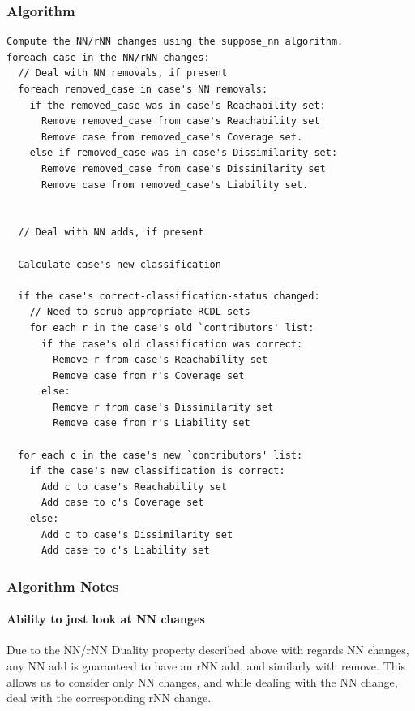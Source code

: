 \documentclass[a4paper,11pt]{report}
\begin{document}
\medskip

\begin{samepage}

\subsubsection{Algorithm}
{\small 
\begin{verbatim}
Compute the NN/rNN changes using the suppose_nn algorithm.
foreach case in the NN/rNN changes:
  // Deal with NN removals, if present
  foreach removed_case in case's NN removals:
    if the removed_case was in case's Reachability set:
      Remove removed_case from case's Reachability set
      Remove case from removed_case's Coverage set.
    else if removed_case was in case's Dissimilarity set:
      Remove removed_case from case's Dissimilarity set
      Remove case from removed_case's Liability set.


  // Deal with NN adds, if present  
  
  Calculate case's new classification
  
  if the case's correct-classification-status changed:
    // Need to scrub appropriate RCDL sets
    for each r in the case's old `contributors' list:
      if the case's old classification was correct:
        Remove r from case's Reachability set
        Remove case from r's Coverage set
      else:
        Remove r from case's Dissimilarity set
        Remove case from r's Liability set
        
  for each c in the case's new `contributors' list:
    if the case's new classification is correct:
      Add c to case's Reachability set
      Add case to c's Coverage set
    else:
      Add c to case's Dissimilarity set
      Add case to c's Liability set

\end{verbatim}
}
\end{samepage}

\subsubsection{Algorithm Notes}
\paragraph{Ability to just look at NN changes}
Due to the NN/rNN Duality property described above with regards NN changes, any NN add is guaranteed to have an rNN add, and similarly with remove. This allows us to consider only NN changes, and while dealing with the NN change, deal with the corresponding rNN change.
\end{document}
